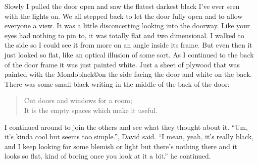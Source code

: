 \documentclass[12pt]{article}
\newcommand{\attrib}[1]{%
  \nopagebreak{\raggedleft\footnotesize #1\par}}
\begin{document}
Slowly I pulled the door open and saw the flatest darkest black
I've ever seen with the lights on. We all stepped back to let the
door fully open and to allow everyone a view. It was a little
disconcerting looking into the doorway.  Like your eyes had
nothing to pin to, it was totally flat and two dimensional. I
walked to the side so I could see it from more on an angle inside
its frame. But even then it just looked so flat, like an optical
illusion of some sort. As I continued to the back of the door
frame it was just painted white. Just a sheet of plywood that was
painted with the Mondoblack\copyright on the side facing the door and
white on the back. There was some small black writing in the middle of the
back of the door:
\settowidth{\versewidth}{This an average line i think}
\begin{verse}
  Cut doors and windows for a room; \\
  It is the empty spaces which make it useful. \\
\end{verse}
\attrib{Lao Tzu, The Tao Te Ching}


I continued around to join the others and see what they thought
about it. ``Um, it's kinda cool but seems too simple.'', David said. ``I mean,
yeah, it's really black, and I keep looking for some blemish or
light but there's nothing there and it looks so flat, kind of
boring once you look at it a bit.'' he continued. 
\end{document}
